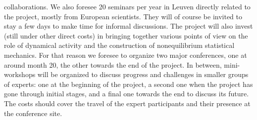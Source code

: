 collaborations.  We also foresee 20 seminars per year in Leuven directly related to the
project, mostly from European scientists. They will of course be invited to stay a few days
to make time for informal discussions. The project will also invest (still under other
direct costs) in bringing together various points of view on the role of dynamical activity
and the construction of nonequilibrium statistical mechanics. For that reason we foresee to
organize two major conferences, one at around month 20, the other towards the end of the
project.  In between, mini-workshops will be organized to discuss progress and challenges in
smaller groups of experts: one at the beginning of the project, a second one when the
project has gone through initial stages, and a final one towards the end to discuss its
future. The costs should cover the travel of the expert participants and their presence at
the conference site.


